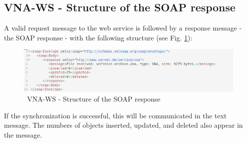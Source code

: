 \documentclass[a4paper,10pt]{book}
\begin{document}
\subsection{VNA-WS - Structure of the SOAP response}
A valid request message to the web service is followed by a response message - the SOAP response - with the following structure (see Fig. \ref{VNA-WS - Structure of the SOAP response}):
\begin{figure}[htb!]
  \centering
  \includegraphics[scale=.7]{Screenshot/VNA-WS-response.png}
  \caption{\label{VNA-WS - Structure of the SOAP response} \ VNA-WS - Structure of the SOAP response}
\end{figure}
\newline
If the synchronization is successful, this will be communicated in the text message. The numbers of objects inserted, updated, and deleted also appear in the message.
\end{document}
